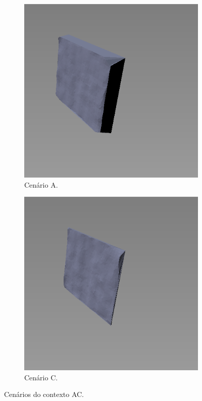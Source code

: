 \begin{figure}[H]
    \centering
    \hspace{1em}
    \begin{subfigure}[t]{0.33\textwidth}
        \includegraphics[width=\textwidth]{dados/figuras/AB2.png}
        \caption{Cenário A.}
    \end{subfigure}
    \hspace{1em}
    \begin{subfigure}[t]{0.33\textwidth}
        \includegraphics[width=\textwidth]{dados/figuras/AB1.png}
        \caption{Cenário C.}
    \end{subfigure}
    \caption{Cenários do contexto AC.}
    \label{fig:contexto_ac}
\end{figure}


